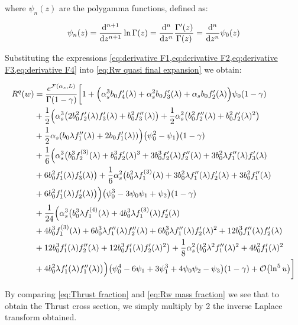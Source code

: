 \documentclass[../main.tex]{subfiles}
\begin{document}
where $\psi_n(z)$ are the polygamma functions, defined as:

\begin{equation}
    \psi_n (z) = \dv[n+1]{z} \ln \Gamma(z) = \dv[n]{z} \frac{\Gamma '(z)}{\Gamma(z)} = \dv[n]{z} \psi_0(z)
\end{equation}

Substituting the expressions \cref{eq:derivative F1,eq:derivative F2,eq:derivative F3,eq:derivative F4} into \cref{eq:Rw quasi final expansion} we obtain:

\begin{align}
    \begin{split}
        R^q(w) &= \frac{e^{\mathcal{F}(\alpha_s,L)}}{\Gamma(1-\gamma)} \biggl[ 1 + \Bigl(\alpha_s^3 b_0 f_4'(\lambda )+\alpha_s^2 b_0 f_3'(\lambda )+\alpha_s b_0 f_2'(\lambda )\Bigr) \psi_0(1-\gamma) \\
        &+ \frac{1}{2} \Bigl(\alpha_s^3 \bigl(2 b_0^2 f_2'(\lambda ) f_3'(\lambda )+b_0^2 f_3''(\lambda )\bigr)+ \frac{1}{2} \alpha_s^2 \qty(b_0^2 f_2''(\lambda )+b_0^2 f_2'(\lambda )^2 ) \\
        &+\frac{1}{2} \alpha_s \qty(b_0 \lambda  f_1''(\lambda ) + 2 b_0 f_1'(\lambda ) )\Bigr) \qty(\psi_0^2-\psi_1)(1-\gamma) \\
        &+ \frac{1}{6}\Bigl( \alpha_s^3 \bigl(b_0^3 f_2^{(3)}(\lambda )+b_0^3 f_2'(\lambda )^3 + 3 b_0^3 f_2'(\lambda ) f_2''(\lambda )+3 b_0^2 \lambda  f_1''(\lambda ) f_3'(\lambda ) \\
        &+6 b_0^2 f_1'(\lambda ) f_3'(\lambda )\bigr) +\frac{1}{6} \alpha_s^2 \bigl(b_0^2 \lambda  f_1^{(3)}(\lambda )+3 b_0^2 \lambda  f_1''(\lambda ) f_2'(\lambda )+3 b_0^2 f_1''(\lambda )\\
        &+6 b_0^2 f_1'(\lambda ) f_2'(\lambda )\bigr) \Bigr) \qty(\psi_0^3 -3 \psi_0\psi_1+\psi_2)(1-\gamma) \\
        &+ \frac{1}{24}\Bigl(\alpha_s^3 \bigl(b_0^3 \lambda  f_1^{(4)}(\lambda )+4 b_0^3 \lambda  f_1^{(3)}(\lambda ) f_2'(\lambda )\\
        &+4 b_0^3 f_1^{(3)}(\lambda )+6 b_0^3 \lambda  f_1''(\lambda ) f_2''(\lambda )+6 b_0^3 \lambda  f_1''(\lambda ) f_2'(\lambda )^2+12 b_0^3 f_1''(\lambda ) f_2'(\lambda )\\
        &+12 b_0^3 f_1'(\lambda ) f_2''(\lambda )+12 b_0^3 f_1'(\lambda ) f_2'(\lambda )^2\bigr)+\frac{1}{8} \alpha_s^2 \bigl(b_0^2 \lambda ^2 f_1''(\lambda )^2+4 b_0^2 f_1'(\lambda )^2\\
        &+4 b_0^2 \lambda  f_1'(\lambda ) f_1''(\lambda )\bigr)\Bigr) \qty(\psi_0^4 -6 \psi_1 + 3\psi_1^3 +4\psi_0\psi_2 -\psi_3)(1-\gamma)+ \order{\ln^5 u} \biggr]
    \end{split}
\end{align}

By comparing \cref{eq:Thrust fraction} and \cref{eq:Rw mass fraction} we see that to obtain the Thrust cross section, we simply multiply by 2 the inverse Laplace transform obtained.
\end{document}
